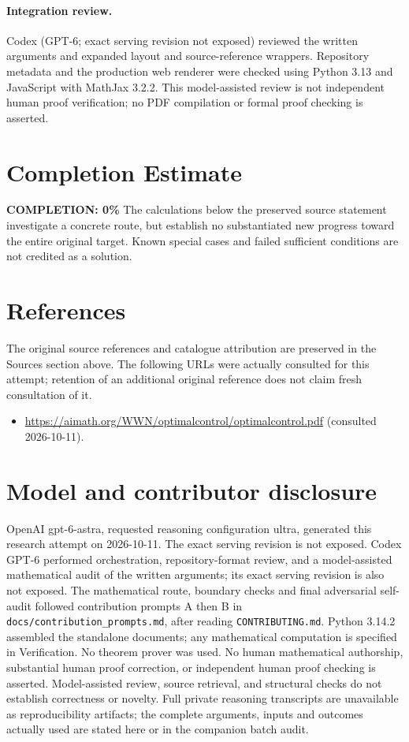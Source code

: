 \documentclass[11pt]{article}
\begin{document}
\paragraph{Integration review.} Codex (GPT-6; exact serving revision not exposed) reviewed the written arguments and expanded layout and source-reference wrappers. Repository metadata and the production web renderer were checked using Python 3.13 and JavaScript with MathJax 3.2.2. This model-assisted review is not independent human proof verification; no PDF compilation or formal proof checking is asserted.

\section{Completion Estimate}
\noindent\textbf{COMPLETION: 0\%}
The calculations below the preserved source statement investigate a concrete route,
but establish no substantiated new progress toward the entire original target.
Known special cases and failed sufficient conditions are not credited as a solution.
\section{References}
The original source references and catalogue attribution are preserved in the
Sources section above. The following URLs were actually consulted for this attempt;
retention of an additional original reference does not claim fresh consultation of it.
\begin{itemize}
\item \url{https://aimath.org/WWN/optimalcontrol/optimalcontrol.pdf} (consulted 2026-10-11). 
\end{itemize}
\section{Model and contributor disclosure}
OpenAI gpt-6-astra, requested reasoning configuration ultra, generated this research
attempt on 2026-10-11. The exact serving revision is not exposed. Codex GPT-6
performed orchestration, repository-format review, and a model-assisted mathematical
audit of the written arguments; its exact serving revision
is also not exposed. The mathematical route, boundary checks and final adversarial
self-audit followed contribution prompts A then B in
\texttt{docs/contribution\_prompts.md}, after reading \texttt{CONTRIBUTING.md}.
Python 3.14.2 assembled the standalone documents; any mathematical computation is
specified in Verification. No theorem prover was used. No human mathematical
authorship, substantial human proof correction, or independent human proof checking
is asserted. Model-assisted review, source retrieval, and structural checks do not
establish correctness or novelty. Full private reasoning transcripts are unavailable
as reproducibility artifacts; the complete arguments, inputs and outcomes actually
used are stated here or in the companion batch audit.
\end{document}

